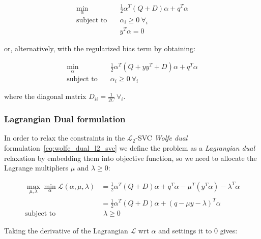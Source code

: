 \begin{equation} \label{eq:wolfe_dual_l2_svc}
    \begin{aligned}
        \min_{\alpha} \quad & \frac{1}{2}\alpha^T (Q + D)\alpha+q^T\alpha \\
            \text{subject to} \quad & \alpha_i\geq 0 \ \forall_i \\ & y^T\alpha=0
    \end{aligned}
\end{equation}

or, alternatively, with the regularized bias term by obtaining:

\begin{equation} \label{eq:reg_bias_wolfe_dual_l2_svc}
    \begin{aligned}
        \min_{\alpha} \quad & \frac{1}{2}\alpha^T (Q + yy^T + D) \alpha + q^T \alpha \\
            \text{subject to} \quad & \alpha_i \geq 0 \ \forall_i
    \end{aligned}
\end{equation}

where the diagonal matrix $\displaystyle D_{ii} = \frac{1}{2C} \ \forall_i$.

\subsubsection{Lagrangian Dual formulation}

In order to relax the constraints in the $\mathcal{L}_2$-SVC \emph{Wolfe dual} formulation~\eqref{eq:wolfe_dual_l2_svc} we define the problem as a \emph{Lagrangian dual} relaxation by embedding them into objective function, so we need to allocate the Lagrange multipliers $\mu$ and $\lambda \geq 0$:

\begin{equation} \label{eq:l2_svc_lagrangian_dual}
	\begin{aligned}
		    \max_{\mu,\lambda} \min_{\alpha} \mathcal{L}(\alpha,\mu,\lambda) &= \frac{1}{2} \alpha^T (Q+D)\alpha+q^T\alpha - \mu^T (y^T \alpha) - \lambda^T \alpha \\
    &= \frac{1}{2} \alpha^T (Q+D)\alpha + (q - \mu y - \lambda)^T \alpha \\
    \text{subject to} \quad & \,\, \lambda \geq 0
	\end{aligned}
\end{equation}

Taking the derivative of the Lagrangian $\mathcal{L}$ wrt $\alpha$ and settings it to 0 gives:

